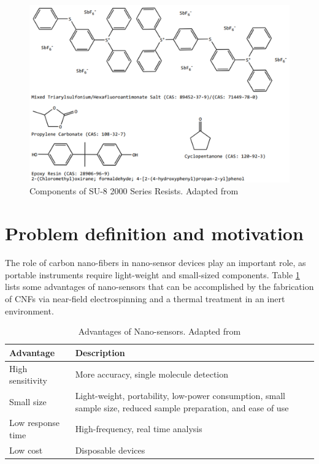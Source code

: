 \begin{figure}[!th]
\centering
\includegraphics[scale=0.50]{./Figures/su8Components.png}
\decoRule
\caption[Components of SU-8 2000 Series Resists]{Components of SU-8 2000 Series Resists. Adapted from \cite{Microchem2012}}
\label{fig:su8Components}
\end{figure}

\section{Problem definition and motivation}


The role of carbon nano-fibers in nano-sensor devices play an important role, as portable instruments require light-weight and small-sized components. \cite{Khanna2016} Table \ref{tab:advantagesOfNanosensors} lists some advantages of nano-sensors that can be accomplished by the fabrication of CNFs via near-field electrospinning and a thermal treatment in an inert environment.

\begin{table}[!th]
\centering
\caption[Advantages of Nano-sensors]{Advantages of Nano-sensors. Adapted from \cite{Khanna2016}}
\begin{tabularx}{\textwidth}{lX}
\hline
\textbf{Advantage} & \textbf{Description} \\
\hline
High sensitivity & More accuracy, single molecule detection \\
Small size & Light-weight, portability, low-power consumption, small sample size, reduced sample preparation, and ease of use \\
Low response time & High-frequency, real time analysis \\
Low cost & Disposable devices \\
\hline
\end{tabularx}
\label{tab:advantagesOfNanosensors}
\end{table}

